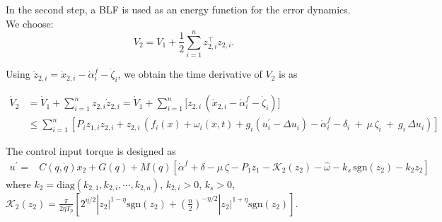 \documentclass[pdflatex,sn-mathphys-num]{sn-jnl}%
\theoremstyle{thmstyleone}%
\theoremstyle{thmstyletwo}%
\theoremstyle{thmstylethree}%
\begin{document}
In the second step, a BLF is used as an energy function for the error dynamics. We choose:
\begin{equation}\label{eq:25}
	V_2= V_1+ \frac{1}{2}\sum_{i=1}^{n}z_{2,i}^{\top}z_{2,i}. 
\end{equation}

Using $\dot z_{2,i}=\dot x_{2,i}-\dot\alpha_i^{f}-\dot\zeta_i$, we obtain the time derivative of $V_2$ is as

\begin{equation}
	\begin{aligned}
		\dot V_2& = \dot V_1+ \sum_{i=1}^{n}z_{2,i} \dot{z}_{2,i}
		=  \dot V_1+\sum_{i=1}^n \Big[z_{2,i}\,(\dot x_{2,i}-\dot\alpha_i^{f}-\dot\zeta_i)\Big]\\
		&
		 \le  \sum_{i=1}^n \left[P_{i}z_{1,i} z_{2,i}+ z_{2,i}\,\left(f_i(x)+\omega_i(x,t)+g_i(u^{\prime}_i-\Delta u_i)-\dot\alpha_i^{f}-\delta_i\ +\ \mu\,\zeta_i\ +\ g_i\,\Delta u_i \right)\right]
	\end{aligned}
\end{equation}

The control input torque is designed as
\begin{equation}\label{eq:tau-cmd}
\begin{aligned}
	u^{\prime} =&C(q,\dot{q})x_2 + G(q)+M(q)\left[\dot\alpha^{f}+\delta -\mu\,\zeta-P_1 z_1-\mathcal{K}_{2}(z_{2})
-\hat \omega
-k_s\,\mathrm{sgn}(z_{2})-k_{2}z_2\right]
\end{aligned}
\end{equation}
where $k_2=\mathrm{diag}(k_{2,1},k_{2,i},\cdots,k_{2,n})$, $k_{2,i}>0$, $k_s>0$, $\mathcal{K}_{2}(z_{2})=\frac{\pi}{2\eta T_p}\left[ 2^{\eta/2} | z_2\vert ^{1-\eta}\mathrm{sgn}(z_2)+(\frac{n}{2})^{-{\eta}/{2} }| z_2\vert ^{1+\eta}\mathrm{sgn}(z_2)\right]$.










\end{document}

